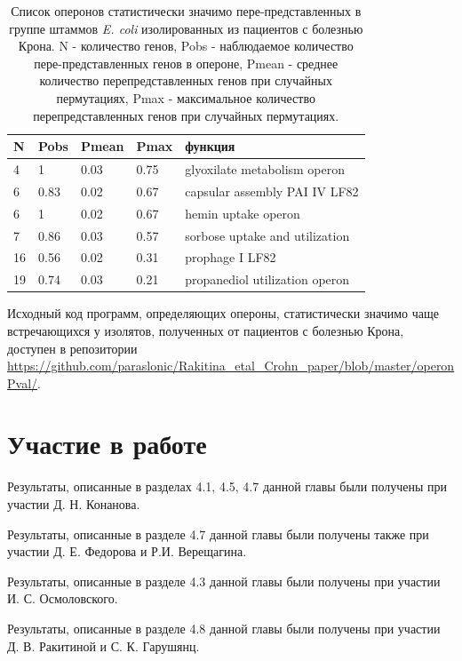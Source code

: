 \begin{table}[htbp]
\centering
\caption{Список оперонов статистически значимо пере-представленных в группе штаммов \textit{E. coli} изолированных из пациентов с болезнью Крона. N - количество генов, Pobs - наблюдаемое количество пере-представленных генов в опероне, Pmean - среднее количество перепредставленных генов при случайных пермутациях, Pmax - максимальное количество перепредставленных генов при случайных пермутациях.}
\label{tbl:ops1}
\begin{tabular}{|l|l|l|l|l|}
\hline
\textbf{N} & \textbf{Pobs} & \textbf{Pmean} & \textbf{Pmax} & \textbf{функция}                                  \\ \hline
4          & 1             & 0.03          & 0.75         & glyoxilate metabolism operon \\ \hline
6          & 0.83          & 0.02          & 0.67         & capsular assembly PAI IV LF82                              \\ \hline
6          & 1             & 0.02          & 0.67         & hemin uptake operon                                       \\ \hline
7          & 0.86          & 0.03          & 0.57         & sorbose uptake and utilization                             \\ \hline
16         & 0.56          & 0.02          & 0.31         & prophage I LF82                                            \\ \hline
19         & 0.74          & 0.03          & 0.21         & propanediol utilization operon                         \\ \hline
\end{tabular}
\end{table}

Исходный код программ, определяющих опероны, статистически значимо чаще встречающихся у изолятов, полученных от пациентов с болезнью Крона, доступен в репозитории \url{https://github.com/paraslonic/Rakitina_etal_Crohn_paper/blob/master/operonPval/}.


\newpage

\section{Участие в работе}

Результаты, описанные в разделах 4.1, 4.5, 4.7 данной главы были получены при участии Д. Н. Конанова.

Результаты, описанные в разделе 4.7 данной главы были получены также при участии Д. Е. Федорова и Р.И. Верещагина.

Результаты, описанные в разделе 4.3 данной главы были получены при участии И. С. Осмоловского.

Результаты, описанные в разделе 4.8 данной главы были получены при участии Д. В. Ракитиной и С. К. Гарушянц. 
